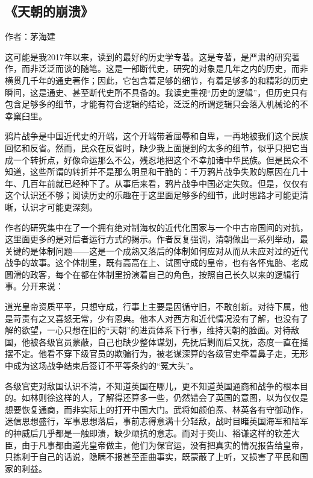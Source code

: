 \subsection{《天朝的崩溃》}

作者：茅海建

这可能是我2017年以来，读到的最好的历史学专著。这是专著，是严肃的研究著作，而非泛泛而谈的随笔。这是一部断代史，研究的对象是几年之内的历史，而非横贯几千年的通史著作；因此，它包含着足够的细节，有着足够多的和精彩的历史瞬间，这是通史、甚至断代史所不具备的。我读史重视“历史的逻辑”，但历史只有包含足够多的细节，才能有符合逻辑的结论，泛泛的所谓逻辑只会落入机械论的不幸窠臼里。

鸦片战争是中国近代史的开端，这个开端带着屈辱和自卑，一再地被我们这个民族回忆和反省。然而，民众在反省时，缺少我上面提到的太多的细节，似乎只把它当成一个转折点，好像命运那么不公，残忍地把这个不幸加诸中华民族。但是民众不知道，这些所谓的转折并不是那么明显和干脆的：千万鸦片战争失败的原因在几十年、几百年前就已经种下了。从事后来看，鸦片战争中国必定失败。但是，仅仅有这个认识还不够；阅读历史的乐趣在于这里面足够多的细节，此时思路才可能更清晰，认识才可能更深刻。

作者的研究集中在了一个拥有绝对制海权的近代化国家与一个中古帝国间的对抗，这里面更多的是对后者运行方式的揭示。作者反复强调，清朝做出一系列举动，最关键的是体制问题——这是一个成熟又落后的体制如何应对从而从未应对过的近代战争的故事。这个体制里，既有高高在上、试图守成的皇帝，也有各怀鬼胎、老成圆滑的政客，每个在都在体制里扮演着自己的角色，按照自己长久以来的逻辑行事。分开来说：
\begin{itemize*}
	\item 道光皇帝资质平平，只想守成，行事上主要是因循守旧，不敢创新。对待下属，他是苛责有之又喜怒无常，少有恩典。他本人对西方和近代情况没有了解，也没有了解的欲望，一心只想在旧的“天朝”的进贡体系下行事，维持天朝的脸面。对待敌国，他被各级官员蒙蔽，自己也缺少整体谋划，先抚后剿而后又抚，态度一直在摇摆不定。他看不穿下级官员的欺骗行为，被老谋深算的各级官吏牵着鼻子走，无形中成为这场战争结束后签订不平等条约的“冤大头”。
	\item 各级官吏对敌国认识不清，不知道英国在哪儿，更不知道英国通商和战争的根本目的。如林则徐这样的人，了解得还算多一些，仍然错会了英国的意图，以为仅仅是想要恢复通商，而非实际上的打开中国大门。武将如颜伯焘、林英各有守御动作，迷信思想盛行，军事思想落后，事前志得意满十分轻敌，战时目睹英国海军和陆军的神威后几乎都是一触即溃，缺少顽抗的意志。而对于奕山、裕谦这样的钦差大臣，由于凡事都由道光皇帝做主，他们为保官运，没有把真实的情况报告给皇帝，只拣利于自己的话说，隐瞒不报甚至歪曲事实，既蒙蔽了上听，又损害了平民和国家的利益。
\end{itemize*}


